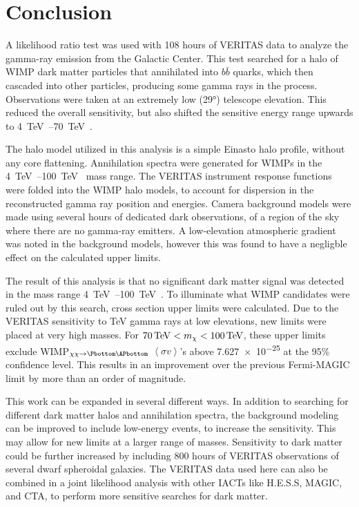 \cleartooddpage[\thispagestyle{empty}]
\chapter{Conclusion}

A likelihood ratio test was used with 108 hours of VERITAS data to analyze the gamma-ray emission from the Galactic Center.
This test searched for a halo of WIMP dark matter particles that annihilated into $b\bar{b}$ quarks, which then cascaded into other particles, producing some gamma rays in the process.
Observations were taken at an extremely low (\nicetilde{}\ang{29}) telescope elevation.
This reduced the overall sensitivity, but also shifted the sensitive energy range upwards to \SIrange{4}{70}{\TeV{}}.

The halo model utilized in this analysis is a simple Einasto halo profile, without any core flattening.
Annihilation spectra were generated for WIMPs in the \SIrange{4}{100}{\TeV{}} mass range.
The VERITAS instrument response functions were folded into the WIMP halo models, to account for dispersion in the reconstructed gamma ray position and energies.
Camera background models were made using several hours of dedicated dark observations, of a region of the sky where there are no gamma-ray emitters.
A low-elevation atmospheric gradient was noted in the background models, however this was found to have a negligble effect on the calculated upper limits.

The result of this analysis is that no significant dark matter signal was detected in the mass range \SIrange{4}{100}{\TeV{}}.
To illuminate what WIMP candidates were ruled out by this search, cross section upper limits were calculated.
Due to the VERITAS sensitivity to TeV gamma rays at low elevations, new limits were placed at very high masses.
For $70\,\TeV<m_{\chi}<100\,\TeV$, these upper limits exclude WIMP$_{\chi\chi\rightarrow\Pbottom\APbottom}$ $\left \langle \sigma v \right \rangle$'s above \SI{7.627e-25}{} at the 95\% confidence level.
This results in an improvement over the previous Fermi-MAGIC limit by more than an order of magnitude.

This work can be expanded in several different ways.
In addition to searching for different dark matter halos and annihilation spectra, the background modeling can be improved to include low-energy events, to increase the sensitivity.
This may allow for new limits at a larger range of masses.
Sensitivity to dark matter could be further increased by including \nicetilde{}800 hours of VERITAS observations of several dwarf spheroidal galaxies.
The VERITAS data used here can also be combined in a joint likelihood analysis with other IACTs like H.E.S.S, MAGIC, and CTA, to perform more sensitive searches for dark matter.

